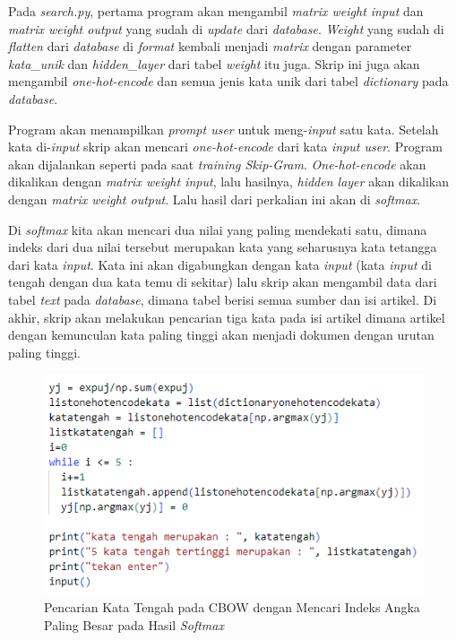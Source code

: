 \documentclass[12pt]{report}
\begin{document}
Pada \textit{search.py}, pertama program akan mengambil \textit{matrix weight input} dan \textit{matrix weight output} yang sudah di \textit{update} dari \textit{database}. \textit{Weight} yang sudah di \textit{flatten} dari \textit{database} di \textit{format} kembali menjadi \textit{matrix} dengan parameter \textit{kata\_unik} dan \textit{hidden\_layer} dari tabel \textit{weight} itu juga. Skrip ini juga akan mengambil \textit{one-hot-encode} dan semua jenis kata unik dari tabel \textit{dictionary} pada \textit{database}. 

Program akan menampilkan \textit{prompt user} untuk meng-\textit{input} satu kata. Setelah kata di-\textit{input} skrip akan mencari \textit{one-hot-encode} dari kata \textit{input user}. Program akan dijalankan seperti pada saat \textit{training Skip-Gram}. \textit{One-hot-encode} akan dikalikan dengan \textit{matrix weight input}, lalu hasilnya, \textit{hidden layer} akan dikalikan dengan \textit{matrix weight output}. Lalu hasil dari perkalian ini akan di \textit{softmax}.

Di \textit{softmax} kita akan mencari dua nilai yang paling mendekati satu, dimana indeks dari dua nilai tersebut merupakan kata yang seharusnya kata tetangga dari kata \textit{input}. Kata ini akan digabungkan dengan kata \textit{input} (kata \textit{input} di tengah dengan dua kata temu di sekitar) lalu skrip akan mengambil data dari tabel \textit{text} pada \textit{database}, dimana tabel berisi semua sumber dan isi artikel. Di akhir, skrip akan melakukan pencarian tiga kata pada isi artikel dimana artikel dengan kemunculan kata paling tinggi akan menjadi dokumen dengan urutan paling tinggi.

\begin{figure}[H]
\centering
\includegraphics[scale=0.75]{pencarian_kata_tengah}
\caption{Pencarian Kata Tengah pada CBOW dengan Mencari Indeks Angka Paling Besar pada Hasil \textit{Softmax}}
\label{pencarian_kata_tengah}
\end{figure}
\end{document}
